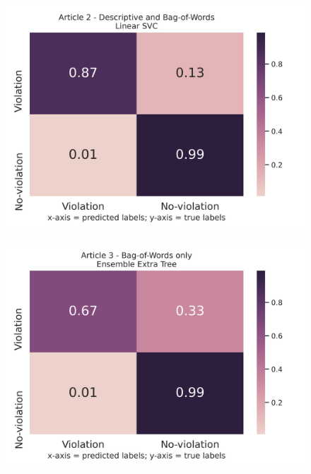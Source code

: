 \documentclass{article}
\begin{document}
\begin{figure}[!htb]
	\centering
    \includegraphics[scale=0.5]{data/analysis/cm/binary_cm_normalized_test_article_2.png}  
\end{figure}
\begin{figure}[!htb]
	\centering
    \includegraphics[scale=0.5]{data/analysis/cm/binary_cm_normalized_test_article_3.png}  
\end{figure}
\end{document}
